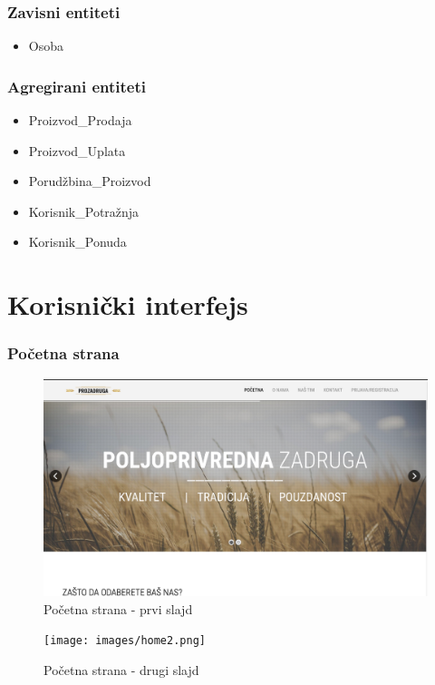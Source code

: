 \documentclass[a4paper]{article}
\begin{document}
\subsubsection{Zavisni entiteti}
\begin{itemize}
    \item Osoba
\end{itemize}
\subsubsection{Agregirani entiteti}
\begin{itemize}
    \item Proizvod\_Prodaja
    \item Proizvod\_Uplata
    \item Porudžbina\_Proizvod
    \item Korisnik\_Potražnja
    \item Korisnik\_Ponuda
\end{itemize}

\section{Korisnički interfejs}
\label{korisnicki_interfejs}

\subsubsection{Početna strana}
\begin{figure}[h!]
    \centering
    \includegraphics[scale=0.3]{images/home1.png}
    \caption{Početna strana - prvi slajd}
    \label{homepage1}
\end{figure}

\begin{figure}[h!]
    \centering
    \texttt{[image: images/home2.png]}
    \caption{Početna strana - drugi slajd}
    \label{homepage2}
\end{figure}
\end{document}

